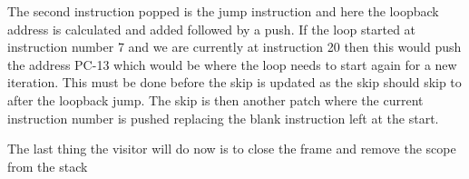 \documentclass[12pt, a4paper]{report}
\begin{document}
The second instruction popped is the jump instruction and here the loopback address is calculated and added followed by a push. If the loop started at instruction number 7 and we are currently at instruction 20 then this would push the address PC-13 which would be where the loop needs to start again for a new iteration. This must be done before the skip is updated as the skip should skip to after the loopback jump. The skip is then another patch where the current instruction number is pushed replacing the blank instruction left at the start. 

The last thing the visitor will do now is to close the frame and remove the scope from the stack
\end{document}

